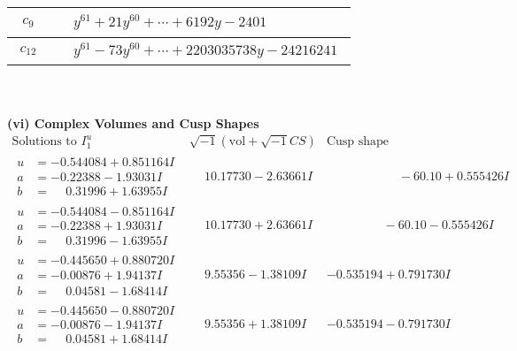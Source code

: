 \documentclass[1p]{elsarticle_modified}
\theoremstyle{definition}
\newcommand{\I}{\sqrt{-1}}
\begin{document}
\begin{tabular}{m{50pt}|m{274pt}}
\hline $$\begin{aligned}c_{9}\end{aligned}$$&$\begin{aligned}
&y^{61}+21 y^{60}+\cdots+6192 y-2401
\end{aligned}$\\
\hline $$\begin{aligned}c_{12}\end{aligned}$$&$\begin{aligned}
&y^{61}-73 y^{60}+\cdots+2203035738 y-24216241
\end{aligned}$\\
\hline
\end{tabular}\\~\\
\newpage\flushleft \textbf{(vi) Complex Volumes and Cusp Shapes}
$$\begin{array}{c|c|c}  
\text{Solutions to }I^u_{1}& \I (\text{vol} + \sqrt{-1}CS) & \text{Cusp shape}\\
 \hline 
\begin{aligned}
u &= -0.544084 + 0.851164 I \\
a &= -0.22388 - 1.93031 I \\
b &= \phantom{-}0.31996 + 1.63955 I\end{aligned}
 & \phantom{-}10.17730 - 2.63661 I & \phantom{-0.000000 -}     -6
0. 10   + 0.555426 I \\ \hline\begin{aligned}
u &= -0.544084 - 0.851164 I \\
a &= -0.22388 + 1.93031 I \\
b &= \phantom{-}0.31996 - 1.63955 I\end{aligned}
 & \phantom{-}10.17730 + 2.63661 I & \phantom{-0.000000 }      -6
0. 10   - 0.555426 I \\ \hline\begin{aligned}
u &= -0.445650 + 0.880720 I \\
a &= -0.00876 + 1.94137 I \\
b &= \phantom{-}0.04581 - 1.68414 I\end{aligned}
 & \phantom{-}9.55356 - 1.38109 I & -0.535194 + 0.791730 I \\ \hline\begin{aligned}
u &= -0.445650 - 0.880720 I \\
a &= -0.00876 - 1.94137 I \\
b &= \phantom{-}0.04581 + 1.68414 I\end{aligned}
 & \phantom{-}9.55356 + 1.38109 I & -0.535194 - 0.791730 I \\ \hline\begin{aligned}

\end{aligned}
\end{array}$$
\end{document}
